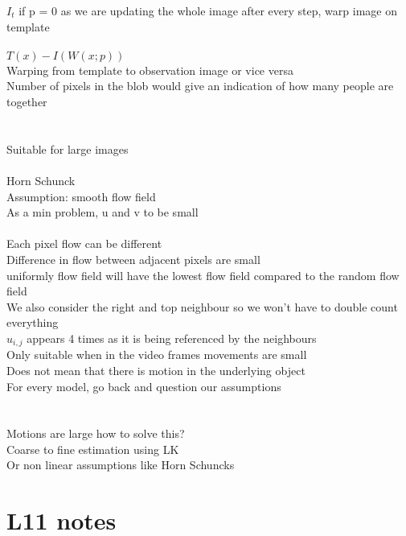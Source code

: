 \documentclass[11pt]{article}
\begin{document}
$I_{t}$ if p = 0 as we are updating the whole image after every step, warp image on template\\\\
$T(x) - I(W(x;p))$ 
\\Warping from template to observation image or vice versa
\\
Number of pixels in the blob would give an indication of how many people are together
\\\\
\\Suitable for large images
\\\\
Horn Schunck\\
Assumption: smooth flow field\\
As a min problem, u and v to be small \\
\\
Each pixel flow can be different
\\
Difference in flow between adjacent pixels are small
\\
uniformly flow field will have the lowest flow field compared to the random flow field
\\
We also consider the right and top neighbour so we won't have to double count everything
\\
$u_{i, j}$ appears 4 times as it is being referenced by the neighbours
\\
Only suitable when in the video frames movements are small
\\
Does not mean that there is motion in the underlying object\\
For every model, go back and question our assumptions\\
\\\\
Motions are large how to solve this?\\
Coarse to fine estimation using LK
\\
Or non linear assumptions like Horn Schuncks
\\
\section*{L11 notes}
\end{document}
